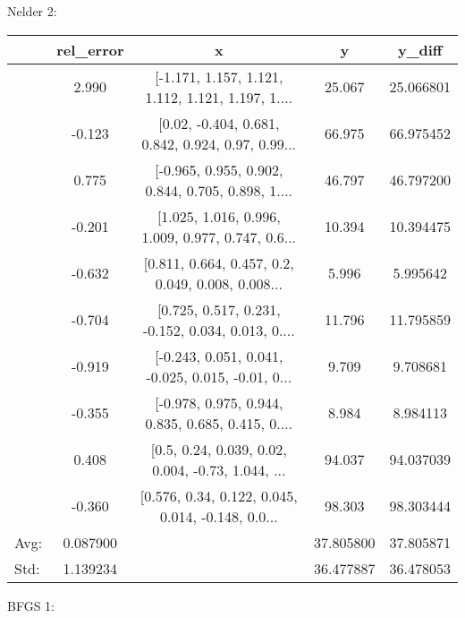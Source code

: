 \documentclass[10pt,onside]{article}
\begin{document}
\begin{description}
Nelder 2:

\begin{tabular}{lcccc}
\toprule
{} &  rel\_error &                                                  x &       y &     y\_diff \\
\midrule
&      2.990 &  [-1.171, 1.157, 1.121, 1.112, 1.121, 1.197, 1.... &  25.067 &  25.066801 \\
&     -0.123 &  [0.02, -0.404, 0.681, 0.842, 0.924, 0.97, 0.99... &  66.975 &  66.975452 \\
&      0.775 &  [-0.965, 0.955, 0.902, 0.844, 0.705, 0.898, 1.... &  46.797 &  46.797200 \\
&     -0.201 &  [1.025, 1.016, 0.996, 1.009, 0.977, 0.747, 0.6... &  10.394 &  10.394475 \\
&     -0.632 &  [0.811, 0.664, 0.457, 0.2, 0.049, 0.008, 0.008... &   5.996 &   5.995642 \\
&     -0.704 &  [0.725, 0.517, 0.231, -0.152, 0.034, 0.013, 0.... &  11.796 &  11.795859 \\
&     -0.919 &  [-0.243, 0.051, 0.041, -0.025, 0.015, -0.01, 0... &   9.709 &   9.708681 \\
&     -0.355 &  [-0.978, 0.975, 0.944, 0.835, 0.685, 0.415, 0.... &   8.984 &   8.984113 \\
&      0.408 &  [0.5, 0.24, 0.039, 0.02, 0.004, -0.73, 1.044, ... &  94.037 &  94.037039 \\
&     -0.360 &  [0.576, 0.34, 0.122, 0.045, 0.014, -0.148, 0.0... &  98.303 &  98.303444 \\
\bottomrule
Avg: & 0.087900 &  & 37.805800 & 37.805871 \\
Std: & 1.139234 &  & 36.477887 & 36.478053 \\
\bottomrule
\end{tabular}

BFGS 1:


\end{description}
\end{document}
